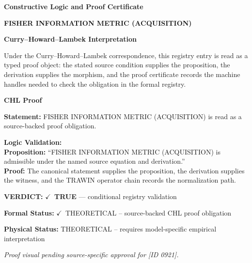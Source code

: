 \clearpage
\begingroup\tzpsupportsetup
\noindent\textbf{\fontsize{10.8pt}{12.8pt}\selectfont [ID 0921] Constructive Logic and Proof Certificate}\par
\noindent\textbf{\fontsize{10pt}{12pt}\selectfont FISHER INFORMATION METRIC (ACQUISITION)}\par
\vspace{0.45em}
\begingroup
\footnotesize
\setlength{\parskip}{0.22em}
\setlength{\parindent}{0pt}
\noindent\textbf{Curry--Howard--Lambek Interpretation}\par
Under the Curry--Howard--Lambek correspondence, this registry entry is read as a typed proof
object: the stated source condition supplies the proposition, the derivation supplies the
morphism, and the proof certificate records the machine handles needed to check the obligation
in the formal registry.

\vspace{0.45em}
\noindent\textbf{CHL Proof}\par
\textbf{Statement:} FISHER INFORMATION METRIC (ACQUISITION) is read as a source-backed proof obligation.

\textbf{Logic Validation:}\\
\textbf{Proposition:} ``FISHER INFORMATION METRIC (ACQUISITION) is admissible under the named source equation and derivation.''\\
\textbf{Proof:} The canonical statement supplies the proposition, the derivation supplies the witness, and the TRAWIN operator chain records the normalization path.

\textbf{VERDICT:} \ensuremath{\checkmark}\ \textbf{TRUE} --- conditional registry validation

\textbf{Formal Status:} \ensuremath{\checkmark}\ THEORETICAL -- source-backed CHL proof obligation

\textbf{Physical Status:} THEORETICAL -- requires model-specific empirical interpretation
\par\vspace{0.45em}
\par
\vfill
\begingroup\footnotesize\itshape
Proof visual pending source-specific approval for [ID 0921].
\par\endgroup
\vfill
\endgroup
\endgroup
